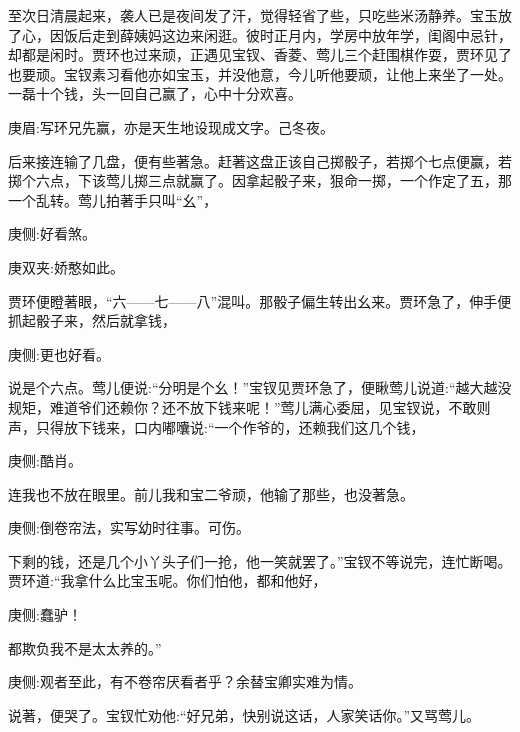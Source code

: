 \begin{parag}
    至次日清晨起来，袭人已是夜间发了汗，觉得轻省了些，只吃些米汤静养。宝玉放了心，因饭后走到薛姨妈这边来闲逛。彼时正月内，学房中放年学，闺阁中忌针，却都是闲时。贾环也过来顽，正遇见宝钗、香菱、莺儿三个赶围棋作耍，贾环见了也要顽。宝钗素习看他亦如宝玉，并没他意，今儿听他要顽，让他上来坐了一处。一磊十个钱，头一回自己赢了，心中十分欢喜。\begin{note}庚眉:写环兄先赢，亦是天生地设现成文字。己冬夜。\end{note}后来接连输了几盘，便有些著急。赶著这盘正该自己掷骰子，若掷个七点便赢，若掷个六点，下该莺儿掷三点就赢了。因拿起骰子来，狠命一掷，一个作定了五，那一个乱转。莺儿拍著手只叫“幺”，\begin{note}庚侧:好看煞。\end{note}\begin{note}庚双夹:娇憨如此。\end{note}贾环便瞪著眼，“六——七——八”混叫。那骰子偏生转出幺来。贾环急了，伸手便抓起骰子来，然后就拿钱，\begin{note}庚侧:更也好看。\end{note}说是个六点。莺儿便说:“分明是个幺！”宝钗见贾环急了，便瞅莺儿说道:“越大越没规矩，难道爷们还赖你？还不放下钱来呢！”莺儿满心委屈，见宝钗说，不敢则声，只得放下钱来，口内嘟囔说:“一个作爷的，还赖我们这几个钱，\begin{note}庚侧:酷肖。\end{note}连我也不放在眼里。前儿我和宝二爷顽，他输了那些，也没著急。\begin{note}庚侧:倒卷帘法，实写幼时往事。可伤。\end{note}下剩的钱，还是几个小丫头子们一抢，他一笑就罢了。”宝钗不等说完，连忙断喝。贾环道:“我拿什么比宝玉呢。你们怕他，都和他好，\begin{note}庚侧:蠢驴！\end{note}都欺负我不是太太养的。”\begin{note}庚侧:观者至此，有不卷帘厌看者乎？余替宝卿实难为情。\end{note}说著，便哭了。宝钗忙劝他:“好兄弟，快别说这话，人家笑话你。”又骂莺儿。
\end{parag}


